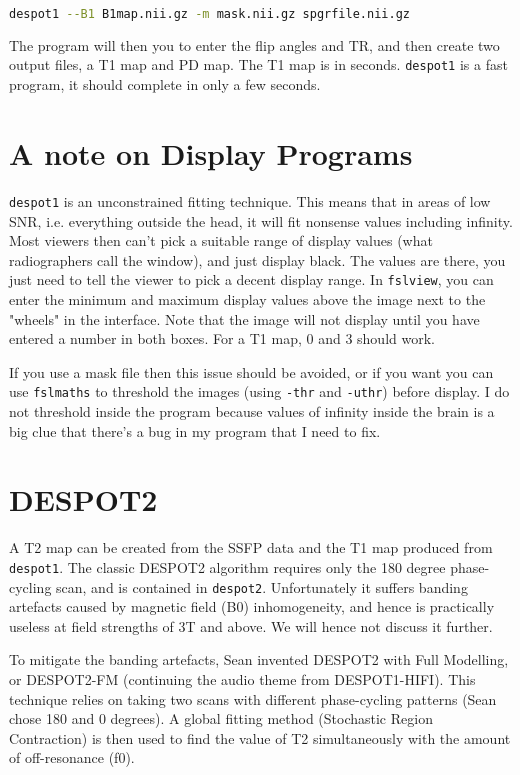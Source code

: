 \documentclass{report}
\begin{document}
\begin{lstlisting}[language=sh]
despot1 --B1 B1map.nii.gz -m mask.nii.gz spgrfile.nii.gz
\end{lstlisting}

The program will then you to enter the flip angles and TR, and then create two output files, a T1 map and PD map. The T1 map is in seconds. \texttt{despot1} is a fast program, it should complete in only a few seconds.

\section{A note on Display Programs}

\texttt{despot1} is an unconstrained fitting technique. This means that in areas of low SNR, i.e. everything outside the head, it will fit nonsense values including infinity. Most viewers then can't pick a suitable range of display values (what radiographers call the window), and just display black. The values are there, you just need to tell the viewer to pick a decent display range. In \texttt{fslview}, you can enter the minimum and maximum display values above the image next to the "wheels" in the interface. Note that the image will not display until you have entered a number in both boxes. For a T1 map, 0 and 3 should work.

If you use a mask file then this issue should be avoided, or if you want you can use \texttt{fslmaths} to threshold the images (using \texttt{-thr} and \texttt{-uthr}) before display. I do not threshold inside the program because values of infinity inside the brain is a big clue that there's a bug in my program that I need to fix.

\section{DESPOT2}

A T2 map can be created from the SSFP data and the T1 map produced from \texttt{despot1}. The classic DESPOT2 algorithm requires only the 180 degree phase-cycling scan, and is contained in \texttt{despot2}. Unfortunately it suffers banding artefacts caused by magnetic field (B0) inhomogeneity, and hence is practically useless at field strengths of 3T and above. We will hence not discuss it further.

To mitigate the banding artefacts, Sean invented DESPOT2 with Full Modelling, or DESPOT2-FM (continuing the audio theme from DESPOT1-HIFI). This technique relies on taking two scans with different phase-cycling patterns (Sean chose 180 and 0 degrees). A global fitting method (Stochastic Region Contraction) is then used to find the value of T2 simultaneously with the amount of off-resonance (f0).
\end{document}
